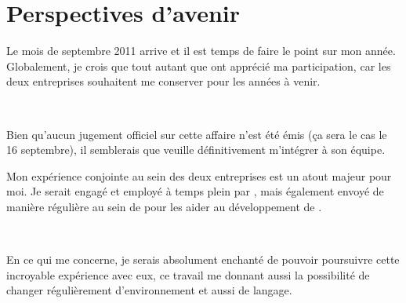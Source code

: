 \chapter{Perspectives d'avenir}
Le mois de septembre 2011 arrive et il est temps de faire le point sur mon année. Globalement, je crois que \solulog{} tout autant que \fidit{} ont apprécié ma participation, car les deux entreprises souhaitent me conserver pour les années à venir.

~

Bien qu'aucun jugement officiel sur cette affaire n'est été émis (ça sera le cas le 16 septembre), il semblerais que \fidit{} veuille définitivement m'intégrer à son équipe.

Mon expérience conjointe au sein des deux entreprises est un atout majeur pour moi. Je serait engagé et employé à temps plein par \fidit, mais également envoyé de manière régulière au sein de \solulog{} pour les aider au développement de \integrale.

~

En ce qui me concerne, je serais absolument enchanté de pouvoir poursuivre cette incroyable expérience avec eux, ce travail me donnant aussi la possibilité de changer régulièrement d'environnement et aussi de langage.
